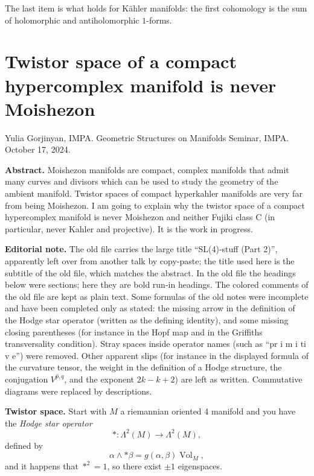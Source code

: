The last item is what holds for Kähler
manifolds: the first cohomology is the sum
of holomorphic and antiholomorphic
$1$-forms.



\section{Twistor space of a compact
hypercomplex manifold is never Moishezon}
\label{section-twistor-moishezon}

\noindent
Yulia Gorjinyan, IMPA.
Geometric Structures on Manifolds Seminar,
IMPA.
October 17, 2024.

\medskip\noindent
{\bf Abstract.}
Moishezon manifolds are compact, complex
manifolds that admit many curves and divisors
which can be used to study the geometry of
the ambient manifold. Twistor spaces of
compact hyperkahler manifolds are very far
from being Moishezon. I am going to explain
why the twistor space of a compact
hypercomplex manifold is never Moishezon and
neither Fujiki class C (in particular, never
Kahler and projective). It is the work in
progress.

\medskip\noindent
{\bf Editorial note.}
The old file carries the large title
``SL(4)-stuff (Part 2)'', apparently left
over from another talk by copy-paste; the
title used here is the subtitle of the old
file, which matches the abstract. In the old
file the headings below were sections; here
they are bold run-in headings. The colored
comments of the old file are kept as plain
text. Some formulas of the old notes were
incomplete and have been completed only as
stated: the missing arrow in the definition
of the Hodge star operator (written as the
defining identity), and some missing closing
parentheses (for instance in the Hopf map and
in the Griffiths transversality condition).
Stray spaces inside operator names (such as
``pr i m i ti v e'') were removed. Other
apparent slips (for instance in the displayed
formula of the curvature tensor, the weight
in the definition of a Hodge structure, the
conjugation $\overline{V^{p,q}}$, and the
exponent $2k-k+2$) are left as written.
Commutative diagrams were replaced by
descriptions.

\medskip\noindent
{\bf Twistor space.}
Start with $M$ a riemannian oriented 4
manifold  and you have the {\it Hodge star
operator}
$$
*:\Lambda^{2}(M)\longrightarrow
\Lambda^{2}(M),
$$
defined by
$$
\alpha\wedge
*\beta=g(\alpha,\beta)\operatorname{Vol}_M,
$$
and it happens that $*^2=1$, so there exist
$\pm 1$ eigenspaces.

